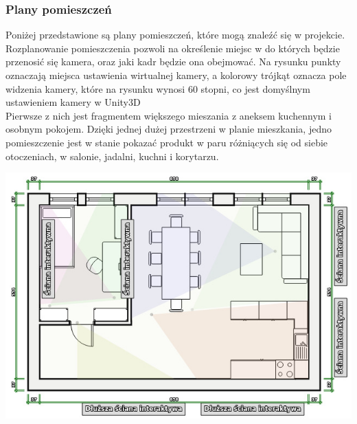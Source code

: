 \documentclass{article} %
\begin{document}
        \subsubsection{Plany pomieszczeń}
        Poniżej przedstawione są plany pomieszczeń, które mogą znaleźć się w projekcie. Rozplanowanie pomieszczenia pozwoli na określenie miejsc w do których będzie przenosić się kamera, oraz jaki kadr będzie ona obejmować. Na rysunku punkty oznaczają miejsca ustawienia wirtualnej kamery, a kolorowy trójkąt oznacza pole widzenia kamery, które na rysunku wynosi 60 stopni, co jest domyślnym ustawieniem kamery w Unity3D
        \\
        
        Pierwsze z nich jest fragmentem większego mieszania z aneksem kuchennym i osobnym pokojem. Dzięki jednej dużej przestrzeni w planie mieszkania, jedno pomieszczenie jest w stanie pokazać produkt w paru różniących się od siebie otoczeniach, w salonie, jadalni, kuchni i korytarzu. 
        \\
        \begin{center}
            \includegraphics[scale=0.5]{images/diagrams/big_salon.jpeg}
        \end{center}
        
\end{document}
